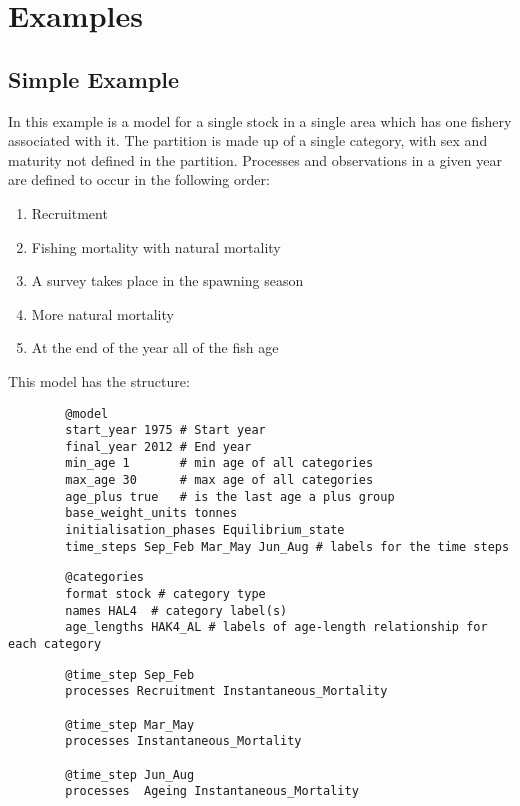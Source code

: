 \section{Examples}\label{Sec:examples}

\subsection{Simple Example}\label{Sec:simp}

In this example is a model for a single stock in a single area which has one fishery associated with it. The partition is made up of a single category, with sex and maturity not defined in the partition. Processes and observations in a given year are defined to occur in the following order:

\begin{enumerate}
	\item Recruitment
	\item Fishing mortality with natural mortality
	\item A survey takes place in the spawning season
	\item More natural mortality
	\item At the end of the year all of the fish age
\end{enumerate}

This model has the structure:

{\small{\begin{verbatim}
		@model
		start_year 1975 # Start year
		final_year 2012 # End year
		min_age 1		# min age of all categories
		max_age 30		# max age of all categories
		age_plus true	# is the last age a plus group
		base_weight_units tonnes
		initialisation_phases Equilibrium_state
		time_steps Sep_Feb Mar_May Jun_Aug # labels for the time steps
		\end{verbatim}}}

{\small{\begin{verbatim}
		@categories
		format stock # category type
		names HAL4  # category label(s)
		age_lengths HAK4_AL # labels of age-length relationship for each category
		\end{verbatim}}}

{\small{\begin{verbatim}
		@time_step Sep_Feb 
		processes Recruitment Instantaneous_Mortality
		
		@time_step Mar_May 
		processes Instantaneous_Mortality 
		
		@time_step Jun_Aug 
		processes  Ageing Instantaneous_Mortality
		\end{verbatim}}}

